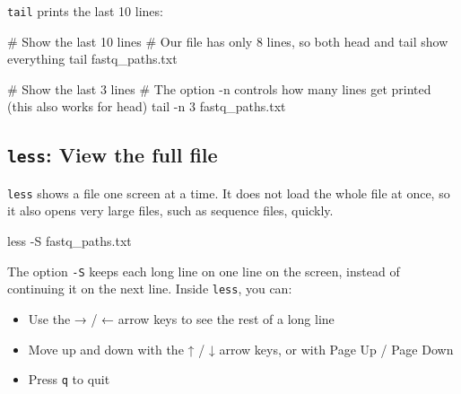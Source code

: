 \documentclass[
  letterpaper,
  DIV=11,
  numbers=noendperiod]{scrreprt}
\newenvironment{Shaded}{}{}
\newcommand{\AttributeTok}[1]{\textcolor[rgb]{0.84,0.23,0.29}{#1}}
\newcommand{\CommentTok}[1]{\textcolor[rgb]{0.42,0.45,0.49}{#1}}
\newcommand{\FunctionTok}[1]{\textcolor[rgb]{0.44,0.26,0.76}{#1}}
\newcommand{\NormalTok}[1]{\textcolor[rgb]{0.14,0.16,0.18}{#1}}
\providecommand{\tightlist}{%
  \setlength{\itemsep}{0pt}\setlength{\parskip}{0pt}}
\begin{document}
\texttt{tail} prints the last 10 lines:

\begin{Shaded}
\begin{Highlighting}[]
\CommentTok{\# Show the last 10 lines}
\CommentTok{\# Our file has only 8 lines, so both head and tail show everything}
\FunctionTok{tail}\NormalTok{ fastq\_paths.txt}

\CommentTok{\# Show the last 3 lines}
\CommentTok{\# The option {-}n controls how many lines get printed (this also works for head)}
\FunctionTok{tail} \AttributeTok{{-}n}\NormalTok{ 3 fastq\_paths.txt}
\end{Highlighting}
\end{Shaded}

\subsection{\texorpdfstring{\texttt{less}: View the full
file}{less: View the full file}}\label{less-view-the-full-file}

\texttt{less} shows a file one screen at a time. It does not load the
whole file at once, so it also opens very large files, such as sequence
files, quickly.

\begin{Shaded}
\begin{Highlighting}[]
\FunctionTok{less} \AttributeTok{{-}S}\NormalTok{ fastq\_paths.txt}
\end{Highlighting}
\end{Shaded}

The option \texttt{-S} keeps each long line on one line on the screen,
instead of continuing it on the next line. Inside \texttt{less}, you
can:

\begin{itemize}
\tightlist
\item
  Use the → / ← arrow keys to see the rest of a long line
\item
  Move up and down with the ↑ / ↓ arrow keys, or with Page Up / Page
  Down
\item
  Press \texttt{q} to quit
\end{itemize}
\end{document}
